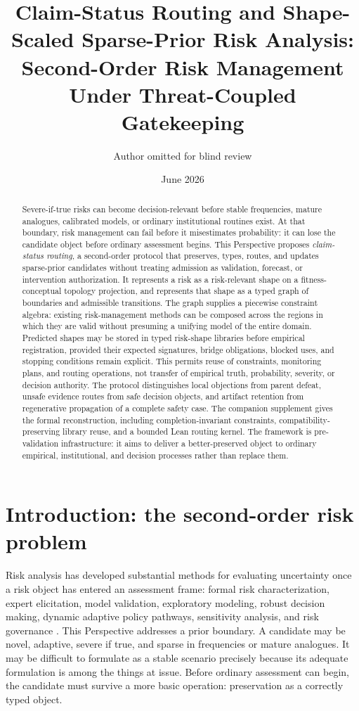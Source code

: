 \documentclass[11pt]{article}
\title{Claim-Status Routing and Shape-Scaled Sparse-Prior Risk Analysis:\\
Second-Order Risk Management Under Threat-Coupled Gatekeeping}
\author{Author omitted for blind review}
\date{June 2026}
\begin{document}
\maketitle

\begin{abstract}
Severe-if-true risks can become decision-relevant before stable frequencies, mature analogues, calibrated models, or ordinary institutional routines exist. At that boundary, risk management can fail before it misestimates probability: it can lose the candidate object before ordinary assessment begins. This Perspective proposes \emph{claim-status routing}, a second-order protocol that preserves, types, routes, and updates sparse-prior candidates without treating admission as validation, forecast, or intervention authorization. It represents a risk as a risk-relevant shape on a fitness-conceptual topology projection, and represents that shape as a typed graph of boundaries and admissible transitions. The graph supplies a piecewise constraint algebra: existing risk-management methods can be composed across the regions in which they are valid without presuming a unifying model of the entire domain. Predicted shapes may be stored in typed risk-shape libraries before empirical registration, provided their expected signatures, bridge obligations, blocked uses, and stopping conditions remain explicit. This permits reuse of constraints, monitoring plans, and routing operations, not transfer of empirical truth, probability, severity, or decision authority. The protocol distinguishes local objections from parent defeat, unsafe evidence routes from safe decision objects, and artifact retention from regenerative propagation of a complete safety case. The companion supplement gives the formal reconstruction, including completion-invariant constraints, compatibility-preserving library reuse, and a bounded Lean routing kernel. The framework is pre-validation infrastructure: it aims to deliver a better-preserved object to ordinary empirical, institutional, and decision processes rather than replace them.
\end{abstract}

\section{Introduction: the second-order risk problem}
\label{sec:introduction}

Risk analysis has developed substantial methods for evaluating uncertainty once a risk object has entered an assessment frame: formal risk characterization, expert elicitation, model validation, exploratory modeling, robust decision making, dynamic adaptive policy pathways, sensitivity analysis, and risk governance \cite{kaplan1981,cooke1991,bankes1993,lempert2003,benhaim2006,haasnoot2013,marchau2019,renn2008}. This Perspective addresses a prior boundary. A candidate may be novel, adaptive, severe if true, and sparse in frequencies or mature analogues. It may be difficult to formulate as a stable scenario precisely because its adequate formulation is among the things at issue. Before ordinary assessment can begin, the candidate must survive a more basic operation: preservation as a correctly typed object.
\end{document}

